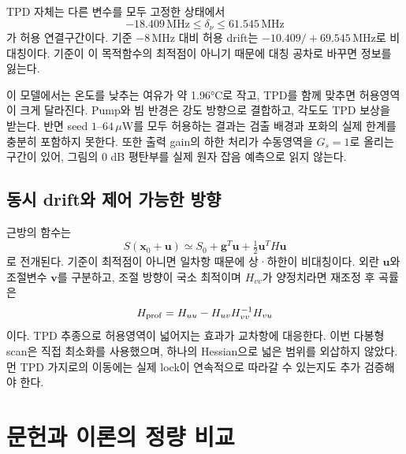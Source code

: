 \documentclass[11pt,a4paper]{article}
\newcommand{\MHz}{\,\mathrm{MHz}}
\begin{document}
TPD 자체는 다른 변수를 모두 고정한 상태에서
\begin{equation}
 -18.409\MHz\leq\delta_\nu\leq61.545\MHz
\end{equation}
가 허용 연결구간이다. 기준 $-8\MHz$ 대비 허용 drift는
$-10.409/+69.545\MHz$로 비대칭이다. 기준이 이 목적함수의 최적점이
아니기 때문에 대칭 공차로 바꾸면 정보를 잃는다.

이 모델에서는 온도를 낮추는 여유가 약 1.96°C로 작고, TPD를 함께 맞추면
허용영역이 크게 달라진다. Pump와 빔 반경은 강도 방향으로 결합하고,
각도도 TPD 보상을 받는다. 반면 seed $1$--$64\,\mu$W를 모두 허용하는
결과는 검출 배경과 포화의 실제 한계를 충분히 포함하지 못한다.
또한 출력 gain의 하한 처리가 수동영역을 $G_s=1$로 올리는 구간이 있어,
그림의 0 dB 평탄부를 실제 원자 잡음 예측으로 읽지 않는다.

\subsection{동시 drift와 제어 가능한 방향}
근방의 함수는
\begin{equation}
 S(\bm x_0+\bm u)\simeq S_0+\bm g^T\bm u+\tfrac12\bm u^TH\bm u
\end{equation}
로 전개된다. 기준이 최적점이 아니면 일차항 때문에 상·하한이 비대칭이다.
외란 $\bm u$와 조절변수 $\bm v$를 구분하고, 조절 방향이 국소 최적이며
$H_{vv}$가 양정치라면 재조정 후 곡률은
\begin{equation}
 H_{\rm prof}=H_{uu}-H_{uv}H_{vv}^{-1}H_{vu}
\end{equation}
이다. TPD 추종으로 허용영역이 넓어지는 효과가 교차항에 대응한다.
이번 다봉형 scan은 직접 최소화를 사용했으며, 하나의 Hessian으로
넓은 범위를 외삽하지 않았다. 먼 TPD 가지로의 이동에는 실제 lock이
연속적으로 따라갈 수 있는지도 추가 검증해야 한다.

\section{문헌과 이론의 정량 비교}
\end{document}
